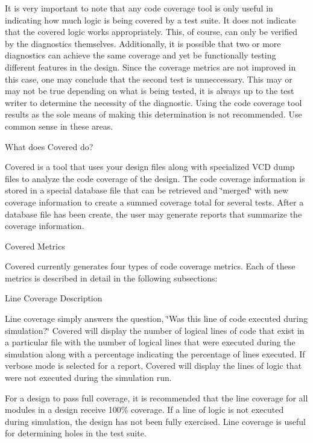  It is very important to note that any code coverage tool is only useful in indicating how much logic is being covered by a test suite. It does not indicate that the covered logic works appropriately. This, of course, can only be verified by the diagnostics themselves. Additionally, it is possible that two or more diagnostics can achieve the same coverage and yet be functionally testing different features in the design. Since the coverage metrics are not improved in this case, one may conclude that the second test is unneccessary. This may or may not be true depending on what is being tested, it is always up to the test writer to determine the necessity of the diagnostic. Using the code coverage tool results as the sole means of making this determination is not recommended. Use common sense in these areas.\begin{Desc}
\item[What does Covered do?]\par
 Covered is a tool that uses your design files along with specialized VCD dump files to analyze the code coverage of the design. The code coverage information is stored in a special database file that can be retrieved and \char`\"{}merged\char`\"{} with new coverage information to create a summed coverage total for several tests. After a database file has been create, the user may generate reports that summarize the coverage information.\end{Desc}
\begin{Desc}
\item[Covered Metrics]\par
 Covered currently generates four types of code coverage metrics. Each of these metrics is described in detail in the following subsections:\end{Desc}
\begin{Desc}
\item[Line Coverage Description]\par
 Line coverage simply answers the question, \char`\"{}Was this line of code executed during simulation?\char`\"{} Covered will display the number of logical lines of code that exist in a particular file with the number of logical lines that were executed during the simulation along with a percentage indicating the percentage of lines executed. If verbose mode is selected for a report, Covered will display the lines of logic that were not executed during the simulation run.

 For a design to pass full coverage, it is recommended that the line coverage for all modules in a design receive 100\% coverage. If a line of logic is not executed during simulation, the design has not been fully exercised. Line coverage is useful for determining holes in the test suite.\end{Desc}
